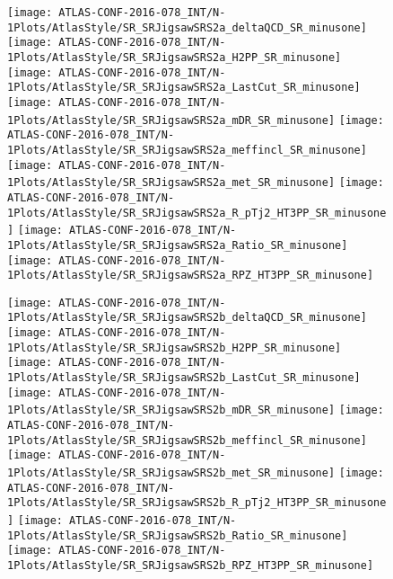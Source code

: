 \begin{figure}[tbph]
\begin{center}
\texttt{[image: ATLAS-CONF-2016-078\_INT/N-1Plots/AtlasStyle/SR\_SRJigsawSRS2a\_deltaQCD\_SR\_minusone]}
\texttt{[image: ATLAS-CONF-2016-078\_INT/N-1Plots/AtlasStyle/SR\_SRJigsawSRS2a\_H2PP\_SR\_minusone]}
\texttt{[image: ATLAS-CONF-2016-078\_INT/N-1Plots/AtlasStyle/SR\_SRJigsawSRS2a\_LastCut\_SR\_minusone]}
\texttt{[image: ATLAS-CONF-2016-078\_INT/N-1Plots/AtlasStyle/SR\_SRJigsawSRS2a\_mDR\_SR\_minusone]}
\texttt{[image: ATLAS-CONF-2016-078\_INT/N-1Plots/AtlasStyle/SR\_SRJigsawSRS2a\_meffincl\_SR\_minusone]}
\texttt{[image: ATLAS-CONF-2016-078\_INT/N-1Plots/AtlasStyle/SR\_SRJigsawSRS2a\_met\_SR\_minusone]}
\texttt{[image: ATLAS-CONF-2016-078\_INT/N-1Plots/AtlasStyle/SR\_SRJigsawSRS2a\_R\_pTj2\_HT3PP\_SR\_minusone]}
\texttt{[image: ATLAS-CONF-2016-078\_INT/N-1Plots/AtlasStyle/SR\_SRJigsawSRS2a\_Ratio\_SR\_minusone]}
\texttt{[image: ATLAS-CONF-2016-078\_INT/N-1Plots/AtlasStyle/SR\_SRJigsawSRS2a\_RPZ\_HT3PP\_SR\_minusone]}
\end{center}
\caption{}
\label{fig:SR_SRJigsawSRS1b_Ratio_SR_minusone}
\end{figure}

\clearpage
\begin{figure}[tbph]
\begin{center}
\texttt{[image: ATLAS-CONF-2016-078\_INT/N-1Plots/AtlasStyle/SR\_SRJigsawSRS2b\_deltaQCD\_SR\_minusone]}
\texttt{[image: ATLAS-CONF-2016-078\_INT/N-1Plots/AtlasStyle/SR\_SRJigsawSRS2b\_H2PP\_SR\_minusone]}
\texttt{[image: ATLAS-CONF-2016-078\_INT/N-1Plots/AtlasStyle/SR\_SRJigsawSRS2b\_LastCut\_SR\_minusone]}
\texttt{[image: ATLAS-CONF-2016-078\_INT/N-1Plots/AtlasStyle/SR\_SRJigsawSRS2b\_mDR\_SR\_minusone]}
\texttt{[image: ATLAS-CONF-2016-078\_INT/N-1Plots/AtlasStyle/SR\_SRJigsawSRS2b\_meffincl\_SR\_minusone]}
\texttt{[image: ATLAS-CONF-2016-078\_INT/N-1Plots/AtlasStyle/SR\_SRJigsawSRS2b\_met\_SR\_minusone]}
\texttt{[image: ATLAS-CONF-2016-078\_INT/N-1Plots/AtlasStyle/SR\_SRJigsawSRS2b\_R\_pTj2\_HT3PP\_SR\_minusone]}
\texttt{[image: ATLAS-CONF-2016-078\_INT/N-1Plots/AtlasStyle/SR\_SRJigsawSRS2b\_Ratio\_SR\_minusone]}
\texttt{[image: ATLAS-CONF-2016-078\_INT/N-1Plots/AtlasStyle/SR\_SRJigsawSRS2b\_RPZ\_HT3PP\_SR\_minusone]}
\end{center}
\caption{}
\label{fig:SR_SRJigsawSRS2a_meffincl_SR_minusone}
\end{figure}

